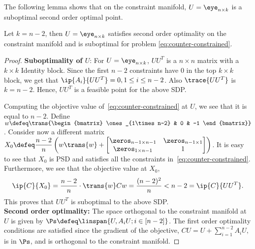 The following lemma shows that on the constraint manifold, $U = \eye_{n \times k}$ is a suboptimal second order optimal point.
\begin{lemma}
Let $k=n-2$, then $U = \eye_{n \times k}$ satisfies second order optimality on the constraint manifold and is suboptimal for problem \eqref{eq:counter-constrained}. 
\end{lemma}
\begin{proof}

\noindent \textbf{Suboptimality of $U$}: For $U = \eye_{n \times k}$, $UU^T$ is a $n\times n$ matrix with a $k \times k$ Identity block. Since the first $n-2$ constraints have $0$ in the top $k \times k$ block, we get that $\ip{A_i}{UU^T}=0, 1 \leq i \leq n-2$. Also $\trace{UU^T}$ is $k=n-2$. Hence, $UU^T$ is a feasible point for the above SDP. 

Computing the objective value of~\eqref{eq:counter-constrained} at $U$, we see that it is equal to $n-2$. Define $w \defeq \trans{\begin{bmatrix}
\ones_{1\times n-2} & 0 & -1
\end{bmatrix}}$. Consider now a different matrix $\displaystyle X_0 \defeq \frac{n-2}{n} \left(w \trans{w} + \begin{bmatrix} \zeros_{n-1 \times n-1} & \zeros_{n-1 \times 1} \\ \zeros_{1 \times n-1} & 1 \end{bmatrix}\right)$. It is easy to see that $X_0$ is PSD and satisfies all the constraints in~\eqref{eq:counter-constrained}. Furthermore, we see that the objective value at $X_0$, $$\displaystyle \ip{C}{X_0} = \frac{n-2}{n} \cdot \trans{w}Cw = \frac{(n-2)^2}{n} < n-2 =\ip{C}{UU^T}.$$ This proves that $UU^T$ is suboptimal to the above SDP.\\

\noindent	\textbf{Second order optimality:} The space orthogonal to the constraint manifold at $U$ is given by $\displaystyle \Ps \defeq \linspan{U,  A_i U; i\in[n-2]}$. The first order optimality conditions are satisfied since the gradient of the objective, $CU = U + \sum_{i=1}^{n-2} A_i U,$ is in $\Ps$, and is orthogonal to the constraint manifold. 



\end{proof}
